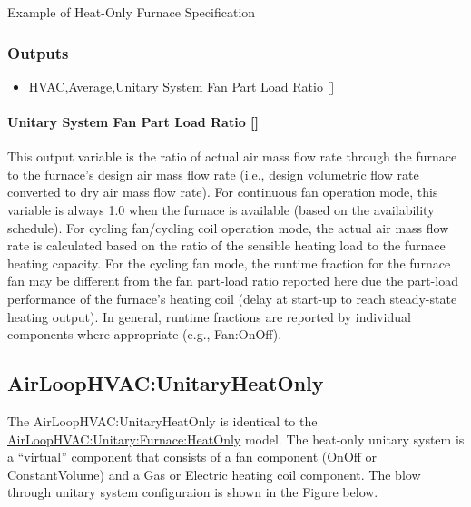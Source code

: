 Example of Heat-Only Furnace Specification

\subsubsection{Outputs}\label{outputs-4-018}

\begin{itemize}
\tightlist
\item
  HVAC,Average,Unitary System Fan Part Load Ratio {[]}
\end{itemize}

\paragraph{Unitary System Fan Part Load Ratio {[]}}\label{unitary-system-fan-part-load-ratio-5}

This output variable is the ratio of actual air mass flow rate through the furnace to the furnace's design air mass flow rate (i.e., design volumetric flow rate converted to dry air mass flow rate). For continuous fan operation mode, this variable is always 1.0 when the furnace is available (based on the availability schedule). For cycling fan/cycling coil operation mode, the actual air mass flow rate is calculated based on the ratio of the sensible heating load to the furnace heating capacity. For the cycling fan mode, the runtime fraction for the furnace fan may be different from the fan part-load ratio reported here due the part-load performance of the furnace's heating coil (delay at start-up to reach steady-state heating output). In general, runtime fractions are reported by individual components where appropriate (e.g., Fan:OnOff).

\subsection{AirLoopHVAC:UnitaryHeatOnly}\label{airloophvacunitaryheatonly}

The AirLoopHVAC:UnitaryHeatOnly is identical to the \hyperref[airloophvacunitaryfurnaceheatonly]{AirLoopHVAC:Unitary:Furnace:HeatOnly} model. The heat-only unitary system is a ``virtual'' component that consists of a fan component (OnOff or ConstantVolume) and a Gas or Electric heating coil component. The blow through unitary system configuraion is shown in the Figure below.

